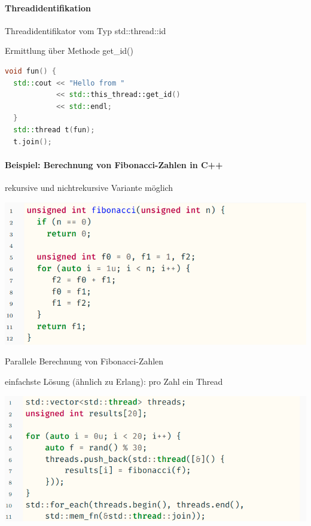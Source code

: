 \documentclass[10pt]{article}
\begin{document}
\paragraph{Threadidentifikation}

\begin{itemize*}
  \item Threadidentifikator vom Typ std::thread::id
  \item Ermittlung über Methode get\_id()
\end{itemize*}
\begin{lstlisting}[language=C++]
  void fun() {
  std::cout << "Hello from "
            << std::this_thread::get_id()
            << std::endl;
  }
  std::thread t(fun);
  t.join();
  \end{lstlisting}

\paragraph{Beispiel: Berechnung von Fibonacci-Zahlen in C++}

\begin{itemize*}
  \item rekursive und nichtrekursive Variante möglich
\end{itemize*}
\begin{center}
  \includegraphics[width=0.4\linewidth]{Assets/Programmierparadigmen-code-snippet-17}
\end{center}

Parallele Berechnung von Fibonacci-Zahlen
\begin{itemize*}
  \item einfachste Lösung (ähnlich zu Erlang): pro Zahl ein Thread
\end{itemize*}
\begin{center}
  \includegraphics[width=0.4\linewidth]{Assets/Programmierparadigmen-code-snippet-18}
\end{center}
\end{document}
